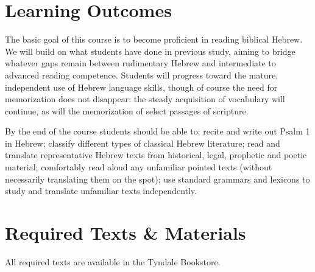 \documentclass[titlepage]{article}
\newcommand\incl{../includes}
\begin{document}


\section{Learning Outcomes}
\label{outcomes}

The basic goal of this course is to become proficient in reading
biblical Hebrew. We will build on what students have done in previous
study, aiming to bridge whatever gaps remain between rudimentary Hebrew
and intermediate to advanced reading competence. Students will progress
toward the mature, independent use of Hebrew language skills, though of
course the need for memorization does not disappear: the steady
acquisition of vocabulary will continue, as will the memorization of
select passages of scripture.

By the end of the course students should be able to:
  recite and write out Psalm 1 in Hebrew;
  classify different types of classical Hebrew literature;
  read and translate representative Hebrew texts from historical, legal, prophetic and poetic material;
  comfortably read aloud any unfamiliar pointed texts (without necessarily translating them on the spot);
  use standard grammars and lexicons to study and translate unfamiliar texts independently.

\section{Required Texts \& Materials}
\label{texts}

All required texts are available in the Tyndale Bookstore.
\end{document}
